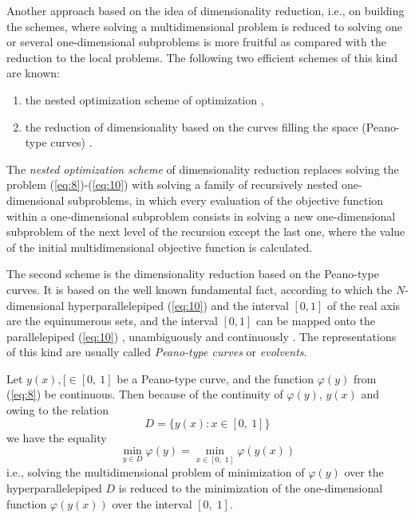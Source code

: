 Another approach based on the idea of dimensionality reduction, i.e., on building the schemes, where solving a multidimensional problem is reduced to solving one or several one-dimensional subproblems is more fruitful as compared with the reduction to the local problems. The following two efficient schemes of this kind are known:
\begin{enumerate}
\item{the nested optimization scheme  of optimization \cite{1_CarrHowe, 1_Evtushenko, 1_GerGriIsr, 1_GerGriGer, 1_GriIsrAIP, 1_GriIsrSerg, 1_GriIsrCEUR, 1_Piyavskij, 1_SergGriJCAA, 1_ShiOlaf, 1_StrMonRus, 1_StrSergMon2000, 1_vanDam},}
\item{the reduction of dimensionality based on the curves filling the space (Peano-type curves) \cite{1_Butz, 1_Goertzel, 1_HimOliPet, 1_LeraSergCNSNS, 1_LeraSergANM, 1_SergStrLeraMonogr, 1_StrMonRus,1_StrSergMon2000}.}
\end{enumerate}
The \textit{nested optimization scheme} of dimensionality reduction replaces solving the problem (\ref{eq:8})-(\ref{eq:10}) with solving a family of recursively nested one-dimensional subproblems, in which every evaluation of the objective function within a one-dimensional subproblem consists in solving a new one-dimensional subproblem of the next level of the recursion except the last one, where the value of the initial multidimensional objective function is calculated. 

The second scheme is the dimensionality reduction based on the Peano-type curves. It is based on the well known fundamental fact, according to which the $N$-dimensional hyperparallelepiped (\ref{eq:10}) and the interval $[0,1]$ of the real axis are the equinumerous sets, and the interval $[0,1]$ can be mapped onto the parallelepiped (\ref{eq:10}) , unambiguously and continuously \cite{1_SergStrLeraMonogr, 1_StrSergMon2000}. The representations of this kind are usually called \textit{Peano-type curves} or \textit{evolvents}. 

Let $y(x),[\in [0,\:1]$  be a Peano-type curve, and the function  $\varphi(y)$ from (\ref{eq:8}) be continuous. Then because of the continuity of  $\varphi(y)$, $y(x)$ and owing to the relation
\begin{displaymath}
D=\{y(x):x\in [0,\:1]\} 
\end{displaymath}
we have the equality
\begin{displaymath}
\min_{y\in D}\varphi(y)=\min_{x\in [0,\;1]}\varphi(y(x)) 
\end{displaymath}
i.e., solving the multidimensional problem of minimization of $\varphi(y)$ over the hyperparallelepiped $D$ is reduced to the minimization of the one-dimensional function $\varphi(y(x))$ over the interval $[0,\;1]$.

